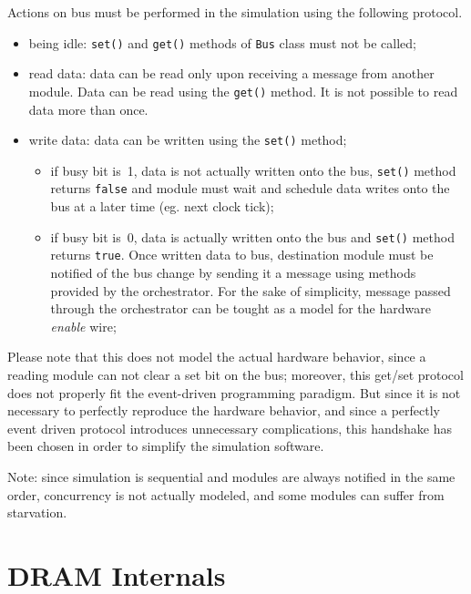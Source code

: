 \documentclass[a4paper,12pt]{article}
\begin{document}
Actions on bus must be performed in the simulation using the following protocol.

\begin{itemize}
  \item being idle: \texttt{set()} and \texttt{get()} methods of \texttt{Bus} class must not be called;
  \item read data: data can be read only upon receiving a message from another module. Data can be read using the \texttt{get()} method. It is not possible to read data more than once.
  \item write data: data can be written using the \texttt{set()} method;
  \begin{itemize}
    \item if busy bit is~1, data is not actually written onto the bus, \texttt{set()} method returns \texttt{false} and module must wait and schedule data writes onto the bus at a later time (eg. next clock tick);
    \item if busy bit is~0, data is actually written onto the bus and \texttt{set()} method returns \texttt{true}.
    Once written data to bus, destination module must be notified of the bus change by sending it a message using methods provided by the orchestrator.
    For the sake of simplicity, message passed through the orchestrator can be tought as a model for the hardware \emph{enable} wire;
  \end{itemize}
\end{itemize}

Please note that this does not model the actual hardware behavior, since a reading module can not clear a set bit on the bus;
moreover, this get/set protocol does not properly fit the event-driven programming paradigm.
But since it is not necessary to perfectly reproduce the hardware behavior, and since a perfectly event driven protocol introduces unnecessary complications, this handshake has been chosen in order to simplify the simulation software.

Note: since simulation is sequential and modules are always notified in the same order, concurrency is not actually modeled, and some modules can suffer from starvation.


\section{DRAM Internals}
\end{document}
